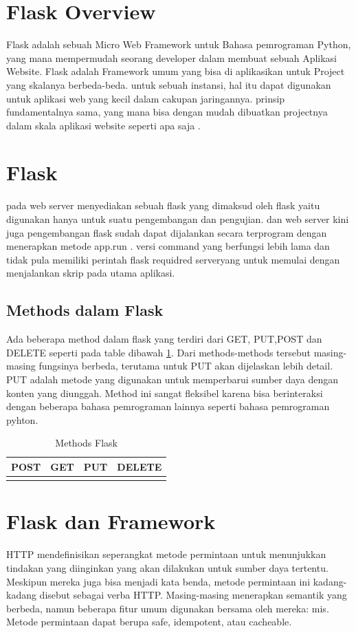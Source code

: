 \section{Flask Overview}
Flask adalah sebuah Micro Web Framework untuk Bahasa pemrograman Python, yang mana  mempermudah
seorang developer dalam membuat sebuah Aplikasi Website. Flask adalah Framework umum
yang bisa di aplikasikan untuk Project yang skalanya berbeda-beda. untuk sebuah 
instansi, hal itu dapat digunakan untuk aplikasi web yang kecil dalam cakupan jaringannya.
prinsip fundamentalnya sama, yang mana bisa dengan mudah dibuatkan projectnya dalam skala aplikasi
website seperti apa saja \cite{alemu2014rest}.

\section{Flask}
pada web server menyediakan sebuah flask yang dimaksud oleh flask yaitu digunakan hanya untuk suatu pengembangan dan pengujian. 
dan web server kini juga pengembangan flask sudah  dapat dijalankan secara terprogram dengan menerapkan metode app.run \(\). 
versi command yang  berfungsi lebih lama dan tidak pula memiliki perintah flask requidred serveryang untuk memulai dengan menjalankan 
skrip pada utama aplikasi.

\subsection{Methods dalam Flask}
Ada beberapa method dalam flask yang terdiri dari GET, PUT,POST dan DELETE seperti pada table dibawah \ref{methods}. 
Dari methods-methods tersebut masing-masing fungsinya berbeda, terutama untuk PUT akan dijelaskan lebih detail. 
PUT adalah metode yang digunakan untuk memperbarui sumber daya dengan konten yang diunggah. 
Method ini sangat fleksibel karena bisa berinteraksi dengan beberapa bahasa pemrograman lainnya seperti bahasa pemrograman pyhton.

\begin{table}[h]
    \caption{Methods Flask}
    \centering
    \begin{tabular}{cccc}
    \hline
    POST&GET&PUT&DELETE\\
    \hline
    \label{methods}
    \end{tabular}
\end{table}


\section{Flask dan Framework}
HTTP mendefinisikan seperangkat metode permintaan untuk menunjukkan tindakan yang diinginkan yang akan dilakukan untuk sumber daya tertentu. 
Meskipun mereka juga bisa menjadi kata benda, metode permintaan ini kadang-kadang disebut sebagai verba HTTP. 
Masing-masing menerapkan semantik yang berbeda, namun beberapa fitur umum digunakan bersama oleh mereka: mis. 
Metode permintaan dapat berupa safe, idempotent, atau cacheable.

